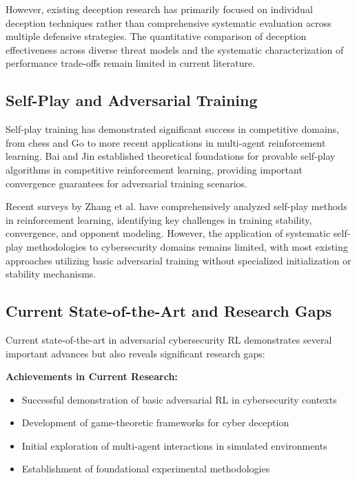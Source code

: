 \documentclass[12pt,twoside]{article}
\begin{document}
However, existing deception research has primarily focused on individual deception techniques rather than comprehensive systematic evaluation across multiple defensive strategies. The quantitative comparison of deception effectiveness across diverse threat models and the systematic characterization of performance trade-offs remain limited in current literature.

\subsection{Self-Play and Adversarial Training}

Self-play training has demonstrated significant success in competitive domains, from chess and Go to more recent applications in multi-agent reinforcement learning. Bai and Jin \cite{bai2020provable} established theoretical foundations for provable self-play algorithms in competitive reinforcement learning, providing important convergence guarantees for adversarial training scenarios.

Recent surveys by Zhang et al. \cite{zhang2024survey} have comprehensively analyzed self-play methods in reinforcement learning, identifying key challenges in training stability, convergence, and opponent modeling. However, the application of systematic self-play methodologies to cybersecurity domains remains limited, with most existing approaches utilizing basic adversarial training without specialized initialization or stability mechanisms.

\subsection{Current State-of-the-Art and Research Gaps}

Current state-of-the-art in adversarial cybersecurity RL demonstrates several important advances but also reveals significant research gaps:

\textbf{Achievements in Current Research:}
\begin{itemize}
\item Successful demonstration of basic adversarial RL in cybersecurity contexts
\item Development of game-theoretic frameworks for cyber deception
\item Initial exploration of multi-agent interactions in simulated environments
\item Establishment of foundational experimental methodologies
\end{itemize}
\end{document}
